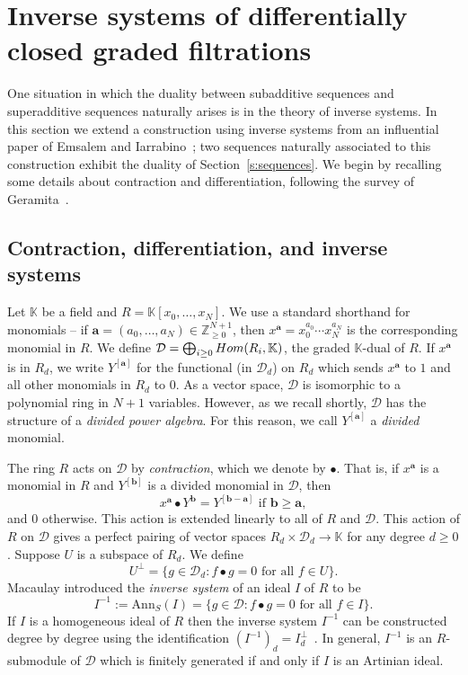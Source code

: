\documentclass[12pt, reqno]{amsart}
\numberwithin{equation}{section}
\newcommand{\Z}{{\mathbb Z}}
\newcommand{\kk}{\mathbb{K}}
\newcommand{\contract}{\bullet}
\theoremstyle{plain} %
\theoremstyle{definition}
\theoremstyle{remark}
\begin{document}
\section{Inverse systems of differentially closed graded filtrations}\label{sec:InverseSystems}

One situation in which the duality between subadditive sequences and superadditive sequences naturally arises is in the theory of inverse systems.  In this section we extend a construction using inverse systems from an influential paper of Emsalem and Iarrabino~\cite{EI95}; two sequences naturally associated to this construction exhibit the duality of Section~\ref{s:sequences}.  We begin by recalling some details about contraction and differentiation, following the survey of Geramita~\cite[Lecture~9]{Ger95}.

\subsection{Contraction, differentiation, and inverse systems}
Let $\kk$ be a field and $R=\kk[x_0,\ldots,x_N]$.  We use a standard shorthand for monomials -- if $\mathbf{a}=(a_0,\ldots,a_N)\in \Z^{N+1}_{\ge 0}$, then $x^\mathbf{a}=x_0^{a_0}\cdots x_N^{a_N}$ is the corresponding monomial in $R$.  We define $\mathcal{D}=\bigoplus_{i\geq 0} {\rm Hom}(R_i,\kk)$, the graded $\kk$-dual of $R$.  If $x^\mathbf{a}$ is in $R_d$, we write $Y^{[\mathbf{a}]}$ for the functional (in $\mathcal{D}_d$) on $R_d$ which sends $x^{\mathbf{a}}$ to $1$ and all other monomials in $R_d$ to $0$.  As a vector space, $\mathcal{D}$ is isomorphic to a polynomial ring in $N+1$ variables.  However, as we recall shortly, $\mathcal{D}$ has the structure of a \textit{divided power algebra}.  For this reason, we call $Y^{[\mathbf{a}]}$ a \textit{divided} monomial.

The ring $R$ acts on $\mathcal{D}$ by \textit{contraction}, which we denote by $\contract$.  That is, if $x^{\mathbf{a}}$ is a monomial in $R$ and $Y^{[\mathbf{b}]}$ is a divided monomial in $\mathcal{D}$, then
\[
x^{\mathbf{a}}\contract Y^\mathbf{b}=Y^{[\mathbf{b}-\mathbf{a}]} \text{ if } \mathbf{b} \ge \mathbf{a},
\]
and $0$ otherwise.  This action is extended linearly to all of $R$ and $\mathcal{D}$.  This action of $R$ on $\mathcal{D}$ gives a perfect pairing of vector spaces $R_d\times \mathcal{D}_d \to \kk$ for any degree $d\ge 0$.  Suppose $U$ is a subspace of $R_d$.  We define
\[
U^{\perp}=\{g\in \mathcal{D}_d: f\contract g=0 \mbox{ for all } f\in U\}.
\]
Macaulay \cite{Macaulay} introduced the {\em inverse system} of an ideal $I$ of $R$ to be
\[
I^{-1}:= \mbox{Ann}_S(I)=\{g\in \mathcal{D}: f\contract g=0 \mbox{ for all } f\in I\}.
\]
If $I$ is a homogeneous ideal of $R$ then the inverse system $I^{-1}$ can be constructed degree by degree using the identification $(I^{-1})_d=I_d^{\perp}$~\cite[Proposition~2.5]{Ger95}.  In general, $I^{-1}$ is an $R$-submodule of $\mathcal{D}$ which is finitely generated if and only if $I$ is an Artinian ideal.
\end{document}
